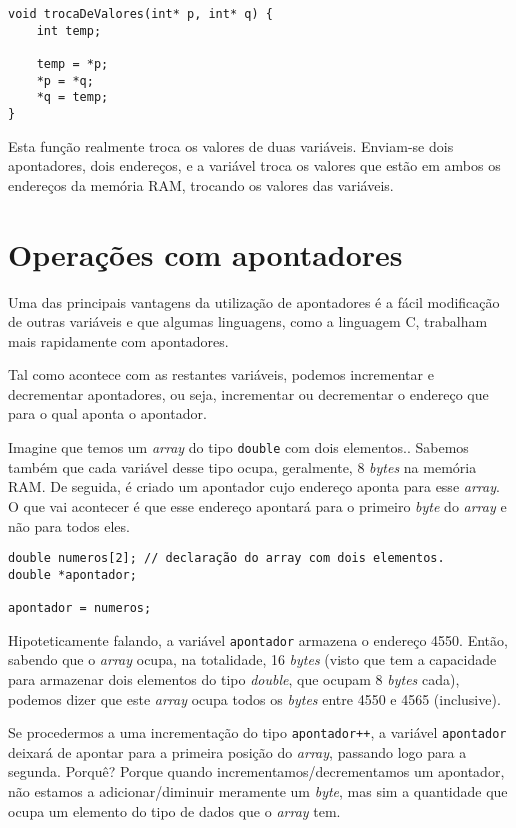 \begin{lstlisting}
void trocaDeValores(int* p, int* q) {
    int temp;

    temp = *p;
    *p = *q;
    *q = temp;
}
\end{lstlisting}

Esta função realmente troca os valores de duas variáveis. Enviam-se dois apontadores, dois endereços, e a variável troca os valores que estão em ambos os endereços da memória RAM, trocando os valores das variáveis.

\section{Operações com apontadores}

Uma das principais vantagens da utilização de apontadores é a fácil modificação de outras variáveis e que algumas linguagens, como a linguagem C, trabalham mais rapidamente com apontadores.

Tal como acontece com as restantes variáveis, podemos incrementar e decrementar apontadores, ou seja, incrementar ou decrementar o endereço que para o qual aponta o apontador.

Imagine que temos um \textit{array} do tipo \texttt{double} com dois elementos.. Sabemos também que cada variável desse tipo ocupa, geralmente, 8 \textit{bytes} na memória RAM. De seguida, é criado um apontador cujo endereço aponta para esse \textit{array}. O que vai acontecer é que esse endereço apontará para o primeiro \textit{byte} do \textit{array} e não para todos eles.

\begin{lstlisting}
double numeros[2]; // declaração do array com dois elementos.
double *apontador;

apontador = numeros;
\end{lstlisting}

Hipoteticamente falando, a variável \texttt{apontador} armazena o endereço 4550. Então, sabendo que o \textit{array} ocupa, na totalidade, 16 \textit{bytes} (visto que tem a capacidade para armazenar dois elementos do tipo \textit{double}, que ocupam 8 \textit{bytes} cada), podemos dizer que este \textit{array} ocupa todos os \textit{bytes} entre 4550 e 4565 (inclusive).

Se procedermos a uma incrementação do tipo \texttt{apontador++}, a variável \texttt{apontador} deixará de apontar para a primeira posição do \textit{array}, passando logo para a segunda. Porquê? Porque quando incrementamos/decrementamos um apontador, não estamos a adicionar/diminuir meramente um \textit{byte}, mas sim a quantidade que ocupa um elemento do tipo de dados que o \textit{array } tem.

